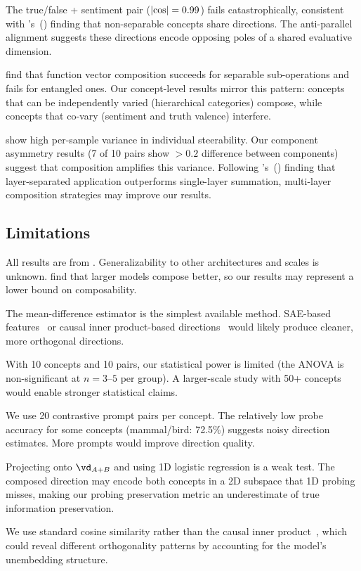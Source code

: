 The true/false + sentiment pair ($|\text{cos}| = 0.99$) fails catastrophically,
consistent with \citeauthor{park2023linear}'s~(\citeyear{park2023linear})
finding that non-separable concepts share directions. The anti-parallel
alignment suggests these directions encode opposing poles of a shared
evaluative dimension.

\citet{todd2023function} find that function vector composition succeeds for
separable sub-operations and fails for entangled ones. Our concept-level
results mirror this pattern: concepts that can be independently varied
(hierarchical categories) compose, while concepts that co-vary (sentiment and
truth valence) interfere.

\citet{tan2024analyzing} show high per-sample variance in individual
steerability. Our component asymmetry results (7 of 10 pairs show $>0.2$
difference between components) suggest that composition amplifies this
variance. Following \citeauthor{stolfo2024improving}'s~(\citeyear{stolfo2024improving})
finding that layer-separated application outperforms single-layer summation,
multi-layer composition strategies may improve our results.

\subsection{Limitations}

All results are from \pythia. Generalizability to other architectures and scales
is unknown. \citet{todd2023function} find that larger models compose better, so
our results may represent a lower bound on composability.

The mean-difference estimator is the simplest available method. SAE-based
features~\citep{chalnev2024improving} or causal inner product-based
directions~\citep{park2023linear} would likely produce cleaner, more orthogonal
directions.

With 10 concepts and 10 pairs, our statistical power is limited (the ANOVA is
non-significant at $n = 3$--$5$ per group). A larger-scale study with 50+
concepts would enable stronger statistical claims.

We use 20 contrastive prompt pairs per concept. The relatively low probe
accuracy for some concepts (mammal/bird: 72.5\%) suggests noisy direction
estimates. More prompts would improve direction quality.

Projecting onto $\dAB$ and using 1D logistic regression is a weak test. The
composed direction may encode both concepts in a 2D subspace that 1D probing
misses, making our probing preservation metric an underestimate of true
information preservation.

We use standard cosine similarity rather than the causal inner
product~\citep{park2023linear}, which could reveal different orthogonality
patterns by accounting for the model's unembedding structure.
